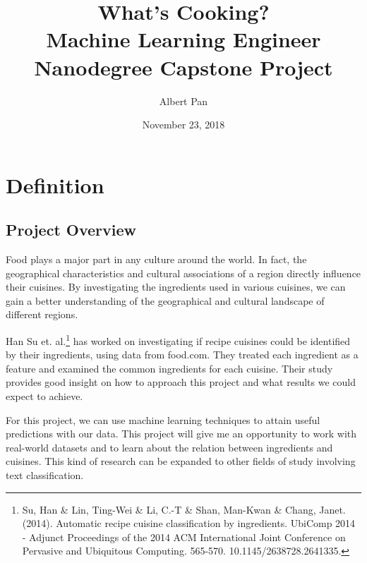 \documentclass[12pt]{article}
\newcommand{\cnum}{\textbf{What's Cooking?}}
\newcommand{\ctitle}[3]{\title{\vspace{-0.5in}\cnum\\#2\vspace{-1ex}}}
\begin{document}
\ctitle{0}{Machine Learning Engineer Nanodegree Capstone Project}{}
\author{Albert Pan}
\date{\vspace{-2ex}November 23, 2018}
\maketitle

\section{Definition}
\subsection{Project Overview}

Food plays a major part in any culture around the world. In fact, the geographical characteristics and cultural associations of a region directly influence their cuisines. By investigating the ingredients used in various cuisines, we can gain a better understanding of the geographical and cultural landscape of different regions.

Han Su et. al.\footnote{Su, Han \& Lin, Ting-Wei \& Li, C.-T \& Shan, Man-Kwan \& Chang, Janet. (2014). Automatic recipe cuisine classification by ingredients. UbiComp 2014 - Adjunct Proceedings of the 2014 ACM International Joint Conference on Pervasive and Ubiquitous Computing. 565-570. 10.1145/2638728.2641335.} has worked on investigating if recipe cuisines could be identified by their ingredients, using data from food.com. They treated each ingredient as a feature and examined the common ingredients for each cuisine. Their study provides good insight on how to approach this project and what results we could expect to achieve.

For this project, we can use machine learning techniques to attain useful predictions with our data. This project will give me an opportunity to work with real-world datasets and to learn about the relation between ingredients and cuisines. This kind of research can be expanded to other fields of study involving text classification.
\end{document}
